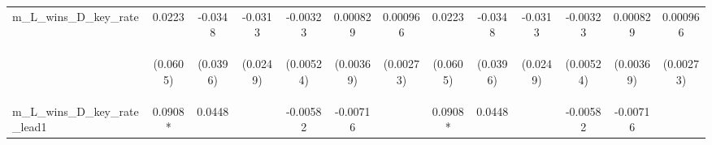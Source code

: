 \documentclass[]{article}
\begin{document}
\begin{center}
\begin{tabular}{lcccccccccccc}
m\_L\_wins\_D\_key\_rate & 0.0223 & -0.0348 & -0.0313 & -0.00323 & 0.000829 & 0.000966 & 0.0223 & -0.0348 & -0.0313 & -0.00323 & 0.000829 & 0.000966 \\
\vspace{4pt} & \begin{footnotesize}(0.0605)\end{footnotesize} & \begin{footnotesize}(0.0396)\end{footnotesize} & \begin{footnotesize}(0.0249)\end{footnotesize} & \begin{footnotesize}(0.00524)\end{footnotesize} & \begin{footnotesize}(0.00369)\end{footnotesize} & \begin{footnotesize}(0.00273)\end{footnotesize} & \begin{footnotesize}(0.0605)\end{footnotesize} & \begin{footnotesize}(0.0396)\end{footnotesize} & \begin{footnotesize}(0.0249)\end{footnotesize} & \begin{footnotesize}(0.00524)\end{footnotesize} & \begin{footnotesize}(0.00369)\end{footnotesize} & \begin{footnotesize}(0.00273)\end{footnotesize} \\
m\_L\_wins\_D\_key\_rate\_lead1 & 0.0908* & 0.0448 &  & -0.00582 & -0.00716 &  & 0.0908* & 0.0448 &  & -0.00582 & -0.00716 &  \\

\end{tabular}
\end{center}
\end{document}
